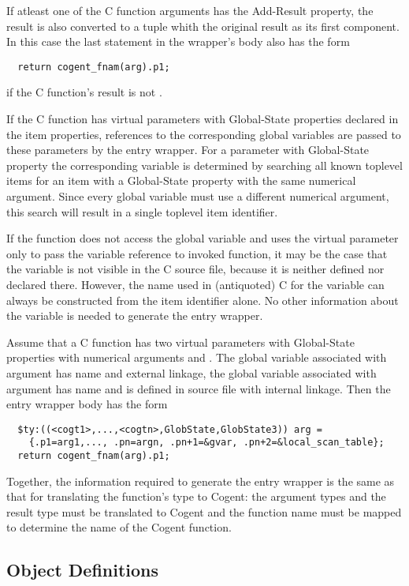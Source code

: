 If atleast one of the C function arguments has the Add-Result property, the result is also converted to a tuple 
whith the original result as its first component. In this case the last statement in the wrapper's body also 
has the form
\begin{verbatim}
  return cogent_fnam(arg).p1;
\end{verbatim}
if the C function's result is not .

If the C function has virtual parameters with Global-State properties declared in the item properties, references
to the corresponding global variables are passed to these parameters by the entry wrapper. For a parameter with 
Global-State property the corresponding variable is determined by searching all known toplevel items for an
item with a Global-State property with the same numerical argument. Since every global variable must use a 
different numerical argument, this search will result in a single toplevel item identifier. 

If the function does not access the global variable and uses the virtual parameter only to pass the variable 
reference to invoked function, it may be the case that the variable is not visible in the C source file, because
it is neither defined nor declared there. However, the name used in (antiquoted) C for the variable can always 
be constructed from the item identifier alone. No other information about the variable is needed to generate the 
entry wrapper.

Assume that a C function has two virtual parameters with Global-State properties with numerical arguments 
 and . The global variable associated with argument  has name  and external linkage,
the global variable associated with argument  has name  and is defined in source file 
with internal linkage. Then the entry wrapper body has the form
\begin{verbatim}
  $ty:((<cogt1>,...,<cogtn>,GlobState,GlobState3)) arg = 
    {.p1=arg1,..., .pn=argn, .pn+1=&gvar, .pn+2=&local_scan_table};
  return cogent_fnam(arg).p1;
\end{verbatim}

Together, the information required to generate the entry wrapper is the same as that for translating the
function's type to Cogent: the argument types and the result type must be translated to Cogent and the
function name must be mapped to determine the name of the Cogent function.

\subsection{Object Definitions}
\label{design-fundefs-object}


